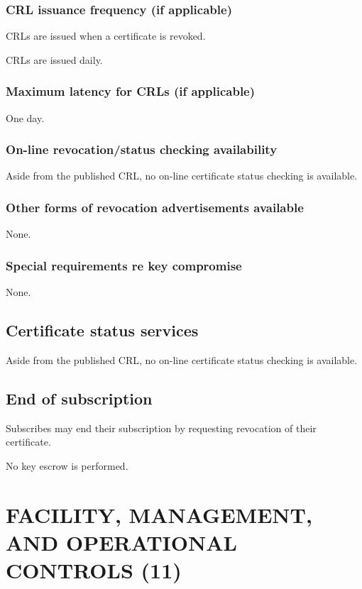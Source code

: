 \documentclass[10pt]{article}
\begin{document}
\subsubsection{CRL issuance frequency (if applicable)}

CRLs are issued when a certificate is revoked.

CRLs are issued daily.

\subsubsection{Maximum latency for CRLs (if applicable)}

One day.

\subsubsection{On-line revocation/status checking availability}

Aside from the published CRL, no on-line certificate status checking
is available.

\subsubsection{Other forms of revocation advertisements available}

None.

\subsubsection{Special requirements re key compromise}

None.

\subsection{Certificate status services}

Aside from the published CRL, no on-line certificate status checking
is available.

\subsection{End of subscription}

Subscribes may end their subscription by requesting revocation of
their certificate.

No key escrow is performed.

\section{FACILITY, MANAGEMENT, AND OPERATIONAL CONTROLS (11)}
\end{document}

